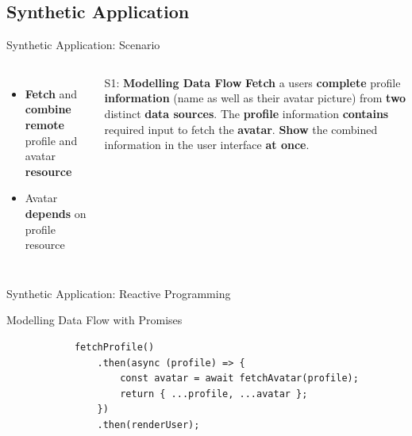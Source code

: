 \documentclass{beamer}
\begin{document}
\subsection*{Synthetic Application}
\begin{frame}{Synthetic Application: Scenario}
	\begin{columns}
			\begin{itemize}
				\item \textbf{Fetch} and \textbf{combine remote} profile and avatar \textbf{resource}\bigskip
				\item Avatar \textbf{depends} on profile resource\bigskip
			\end{itemize}

			\begin{block}{S1: \textbf{Modelling Data Flow}}
				\textbf{Fetch} a users \textbf{complete} profile \textbf{information} (name as well as their avatar picture) from \textbf{two} distinct \textbf{data sources}. The \textbf{profile} information \textbf{contains} required input to fetch the \textbf{avatar}. \textbf{Show} the combined information in the user interface \textbf{at once}.
			\end{block}
	\end{columns}
\end{frame}


\begin{frame}[fragile=singleslide]{Synthetic Application: Reactive Programming}
	\begin{block}{Modelling Data Flow with Promises}
		\begin{verbatim}
			fetchProfile()
				.then(async (profile) => {
					const avatar = await fetchAvatar(profile);
					return { ...profile, ...avatar };
				})
				.then(renderUser);
		\end{verbatim}
	\end{block}
\end{frame}

\end{document}
